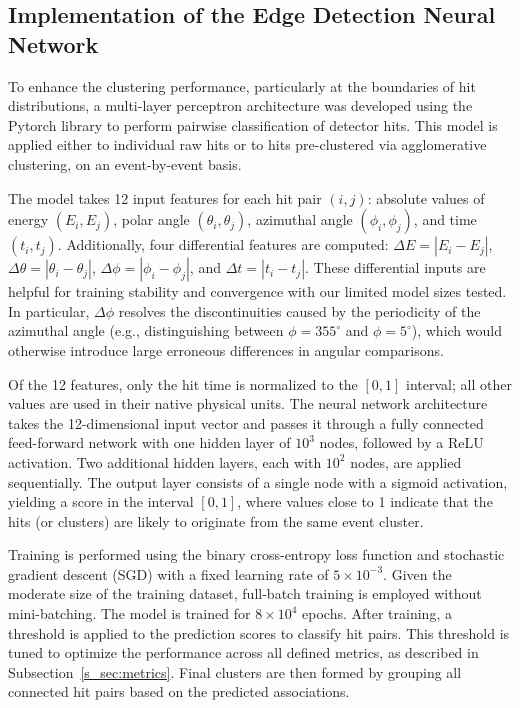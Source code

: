 \documentclass[final,5p,times,twocolumn]{elsarticle}
\begin{document}
\subsection{Implementation of the Edge Detection Neural Network}\label{s_sec:edge}
To enhance the clustering performance, particularly at the boundaries of hit distributions, a multi-layer perceptron architecture was developed using the Pytorch library \cite{imambi2021pytorch} to perform pairwise classification of detector hits. This model is applied either to individual raw hits or to hits pre-clustered via agglomerative clustering, on an event-by-event basis.

The model takes 12 input features for each hit pair $(i, j)$: absolute values of energy $(E_i, E_j)$, polar angle $(\theta_i, \theta_j)$, azimuthal angle $(\phi_i, \phi_j)$, and time $(t_i, t_j)$. Additionally, four differential features are computed: $\Delta E = |E_i - E_j|$, $\Delta \theta = |\theta_i - \theta_j|$, $\Delta \phi = |\phi_i - \phi_j|$, and $\Delta t = |t_i - t_j|$. These differential inputs are helpful for training stability and convergence with our limited model sizes tested. In particular, $\Delta \phi$ resolves the discontinuities caused by the periodicity of the azimuthal angle (e.g., distinguishing between $\phi = 355^\circ$ and $\phi = 5^\circ$), which would otherwise introduce large erroneous differences in angular comparisons.

Of the 12 features, only the hit time is normalized to the $[0, 1]$ interval; all other values are used in their native physical units.
The neural network architecture takes the 12-dimensional input vector and passes it through a fully connected feed-forward network with one hidden layer of $10^3$ nodes, followed by a ReLU activation. Two additional hidden layers, each with $10^2$ nodes, are applied sequentially. The output layer consists of a single node with a sigmoid activation, yielding a score in the interval $[0, 1]$, where values close to 1 indicate that the hits (or clusters) are likely to originate from the same event cluster.\newline

Training is performed using the binary cross-entropy loss function \cite{mannor2005cross,de2005tutorial} and stochastic gradient descent (SGD) \cite{newton2018recent} with a fixed learning rate of $5 \times 10^{-3}$. Given the moderate size of the training dataset, full-batch training is employed without mini-batching. The model is trained for $8 \times 10^4$ epochs. After training, a threshold is applied to the prediction scores to classify hit pairs. This threshold is tuned to optimize the performance across all defined metrics, as described in Subsection~\ref{s_sec:metrics}. Final clusters are then formed by grouping all connected hit pairs based on the predicted associations.
\end{document}

